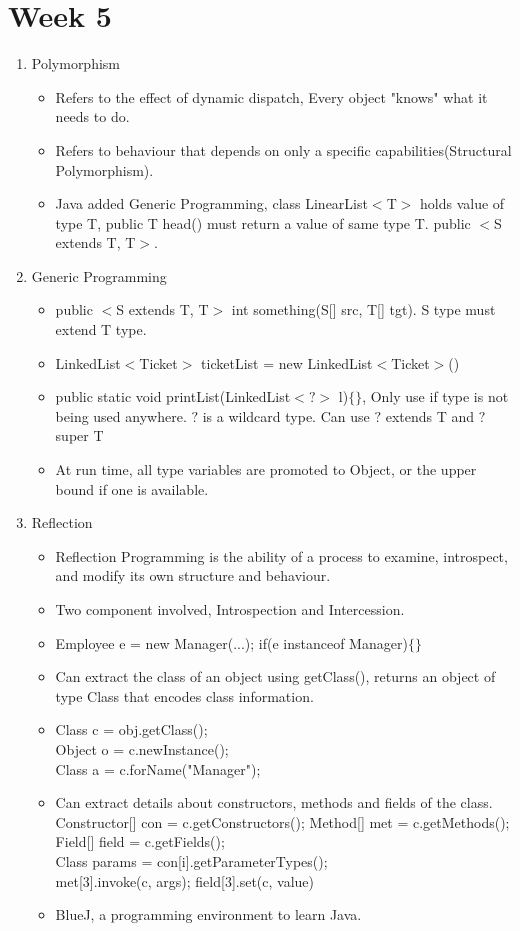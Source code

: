 \documentclass[a4paper]{article}
\begin{document}
\section{Week 5}
\begin{enumerate}
    \item Polymorphism
    \begin{itemize}
        \item Refers to the effect of dynamic dispatch, Every object "knows" what it needs to do.
        \item Refers to behaviour that depends on only a specific capabilities(Structural Polymorphism).
        \item Java added Generic Programming, class LinearList$<$T$>$ holds value of type T, public T head() must return a value of same type T. public $<$S extends T, T$>$.
    \end{itemize}
    \item Generic Programming
    \begin{itemize}
        \item public $<$S extends T, T$>$ int something(S[] src, T[] tgt). S type must extend T type.
        \item LinkedList$<$Ticket$>$ ticketList = new LinkedList$<$Ticket$>$()
        \item public static void printList(LinkedList$<?>$ l)$\{\}$, Only use if type is not being used anywhere. $?$ is a wildcard type. Can use $?$ extends T and $?$ super T
        \item At run time, all type variables are promoted to Object, or the upper bound if one is available.
    \end{itemize}
    \item Reflection
    \begin{itemize}
        \item Reflection Programming is the ability of a process to examine, introspect, and modify its own structure and behaviour.
        \item Two component involved, Introspection and Intercession.
        \item Employee e = new Manager(...); if(e instanceof Manager)$\{\}$
        \item Can extract the class of an object using getClass(), returns an object of type Class that encodes class information.
        \item Class c = obj.getClass();\\
        Object o = c.newInstance();\\
        Class a = c.forName("Manager");
        \item Can extract details about constructors, methods and fields of the class. Constructor[] con = c.getConstructors(); Method[] met = c.getMethods(); Field[] field = c.getFields();\\
        Class params = con[i].getParameterTypes();\\
        met[3].invoke(c, args); field[3].set(c, value)
        \item BlueJ, a programming environment to learn Java.
    \end{itemize}
\end{enumerate}
\end{document}

